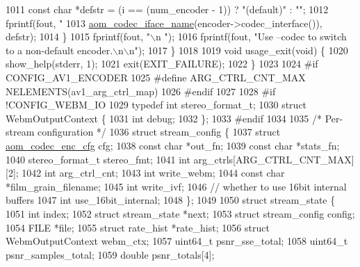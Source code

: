 \begin{DoxyCodeInclude}
{{{{{{{{1011     \textcolor{keyword}{const} \textcolor{keywordtype}{char} *defstr = (i == (num\_encoder - 1)) ? \textcolor{stringliteral}{"(default)"} : \textcolor{stringliteral}{""};
1012     fprintf(fout, \textcolor{stringliteral}{"    %
1013             \hyperlink{group__codec_ga013b1f6d96b2cf9489396311a7e5179b}{aom\_codec\_iface\_name}(encoder->codec\_interface()), defstr);
1014   \}
1015   fprintf(fout, \textcolor{stringliteral}{"\(\backslash\)n        "});
1016   fprintf(fout, \textcolor{stringliteral}{"Use --codec to switch to a non-default encoder.\(\backslash\)n\(\backslash\)n"});
1017 \}
1018 
1019 \textcolor{keywordtype}{void} usage\_exit(\textcolor{keywordtype}{void}) \{
1020   show\_help(stderr, 1);
1021   exit(EXIT\_FAILURE);
1022 \}
1023 
1024 \textcolor{preprocessor}{#if CONFIG\_AV1\_ENCODER}
1025 \textcolor{preprocessor}{#define ARG\_CTRL\_CNT\_MAX NELEMENTS(av1\_arg\_ctrl\_map)}
1026 \textcolor{preprocessor}{#endif}
1027 
1028 \textcolor{preprocessor}{#if !CONFIG\_WEBM\_IO}
1029 \textcolor{keyword}{typedef} \textcolor{keywordtype}{int} stereo\_format\_t;
1030 \textcolor{keyword}{struct }WebmOutputContext \{
1031   \textcolor{keywordtype}{int} debug;
1032 \};
1033 \textcolor{preprocessor}{#endif}
1034 
1035 \textcolor{comment}{/* Per-stream configuration */}
1036 \textcolor{keyword}{struct }stream\_config \{
1037   \textcolor{keyword}{struct }\hyperlink{structaom__codec__enc__cfg}{aom\_codec\_enc\_cfg} cfg;
1038   \textcolor{keyword}{const} \textcolor{keywordtype}{char} *out\_fn;
1039   \textcolor{keyword}{const} \textcolor{keywordtype}{char} *stats\_fn;
1040   stereo\_format\_t stereo\_fmt;
1041   \textcolor{keywordtype}{int} arg\_ctrls[ARG\_CTRL\_CNT\_MAX][2];
1042   \textcolor{keywordtype}{int} arg\_ctrl\_cnt;
1043   \textcolor{keywordtype}{int} write\_webm;
1044   \textcolor{keyword}{const} \textcolor{keywordtype}{char} *film\_grain\_filename;
1045   \textcolor{keywordtype}{int} write\_ivf;
1046   \textcolor{comment}{// whether to use 16bit internal buffers}
1047   \textcolor{keywordtype}{int} use\_16bit\_internal;
1048 \};
1049 
1050 \textcolor{keyword}{struct }stream\_state \{
1051   \textcolor{keywordtype}{int} index;
1052   \textcolor{keyword}{struct }stream\_state *next;
1053   \textcolor{keyword}{struct }stream\_config config;
1054   FILE *file;
1055   \textcolor{keyword}{struct }rate\_hist *rate\_hist;
1056   \textcolor{keyword}{struct }WebmOutputContext webm\_ctx;
1057   uint64\_t psnr\_sse\_total;
1058   uint64\_t psnr\_samples\_total;
1059   \textcolor{keywordtype}{double} psnr\_totals[4];
}}}}}}}}}
\end{DoxyCodeInclude}
